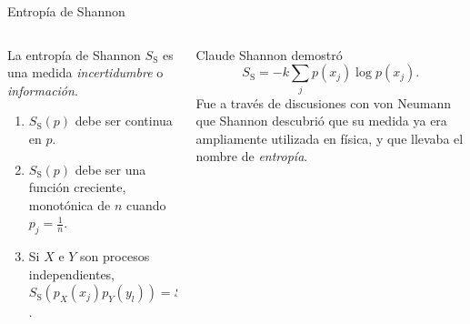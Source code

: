 \begin{frame}{Entropía de Shannon}
    \begin{columns}
        \begin{column}{0.5\textwidth}
            La entropía de Shannon $S_{\text{S}}$ es una medida \textit{incertidumbre} o \textit{información}.
            \pause
            \begin{enumerate}
                \item $S_{\text{S}}(p)$ debe ser continua en $p$. \pause
                \item $S_{\text{S}}(p)$ debe ser una función creciente, monotónica de $n$ cuando $p_{j}=\frac{1}{n}$. \pause
                \item Si $X$ e $Y$ son procesos independientes, $S_{\text{S}}(p_{X}(x_{j})p_{Y}(y_{l}))=S_{\text{S}}(p_{X}(x_{j}))+S_{\text{S}}(p_{Y}(y_{l}))$.
            \end{enumerate}
        \end{column}
        \pause
        \begin{column}{0.5\textwidth}
            Claude Shannon demostró 
            \begin{equation}
                S_{\text{S}}=-k\sum_{j}p(x_{j})\log{p(x_{j})}.\nonumber
            \end{equation}
            \pause
            Fue a través de discusiones con von Neumann que Shannon descubrió que su medida ya era ampliamente utilizada en física, y que llevaba el nombre de \textit{entropía}.   
        \end{column}
    \end{columns}
\end{frame}

